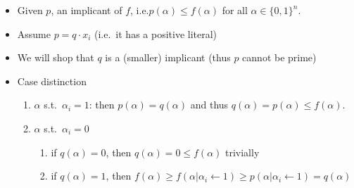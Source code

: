 \documentclass{article}
\author{Thomas Hofmann}
\begin{document}
\begin{itemize}
\item Given $p$, an implicant of $f$, i.e.$p(\alpha) \le f(\alpha)$ for all $\alpha \in \{0,1\}^n$. 
\item Assume $p = q \cdot x_i$ (i.e.~it has a positive literal)
\item We will shop that $q$ is a (smaller) implicant (thus $p$ cannot be prime)
\item Case distinction
\begin{enumerate}
\item $\alpha$ s.t.~$\alpha_i=1$: then $p(\alpha) = q(\alpha)$ and thus $q(\alpha) = p(\alpha) \le f(\alpha)$. 
\item $\alpha$ s.t.~$\alpha_i=0$
\begin{enumerate}
\item if $q(\alpha)=0$, then $q(\alpha) = 0 \le f(\alpha)$ trivially  
\item if $q(\alpha)=1$, then $f(\alpha) \ge f(\alpha|  \alpha_i \leftarrow 1) \ge p(\alpha|  \alpha_i \leftarrow 1) = q(\alpha)$ 
\end{enumerate}
\end{enumerate}
\end{itemize}
\end{document}
